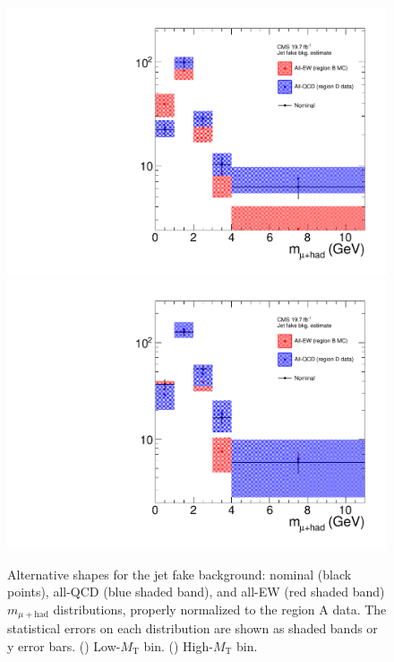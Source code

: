 \begin{figure}[hbtp]
  \begin{center}
    \includegraphics[width=\cmsFigWidth]{figures/jetFakeBkgSystCanvas_lowMT}
    \includegraphics[width=\cmsFigWidth]{figures/jetFakeBkgSystCanvas_highMT}
    \caption{Alternative shapes for the jet fake background: nominal (black points), all-QCD (blue shaded band), and all-EW (red shaded band) $m_{\mu+\text{had}}$ distributions, properly normalized to the region A data.  The statistical errors on each distribution are shown as shaded bands or y error bars.  (\cmsLeft) Low-$M_{\text{T}}$ bin.  (\cmsRight) High-$M_{\text{T}}$ bin.}
    \label{fig:jet-fake-bkg-syst}
  \end{center}
\end{figure}

